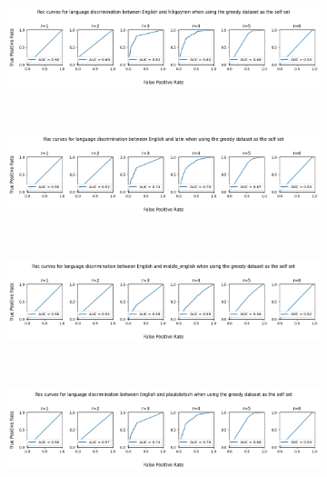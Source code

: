 \documentclass{article}
\begin{document}
\begin{figure}[ht]
    \begin{subfigure}[t]{\linewidth}
        \centering
        \includegraphics[width=\linewidth]{images/english_hiligayon_greedy.png}
        \label{fig:eng_hil_grd}
    \end{subfigure}
    \\
    \begin{subfigure}[t]{\linewidth}
        \centering
        \includegraphics[width=\linewidth]{images/english_latin_greedy.png}
        \label{fig:eng_lat_grd}
    \end{subfigure}
    \\
    \begin{subfigure}[t]{\linewidth}
        \centering
        \includegraphics[width=\linewidth]{images/english_middle_neglish_greedy.png}
        \label{fig:eng_mid_eng_grd}
    \end{subfigure}
    \\
    \begin{subfigure}[t]{\linewidth}
        \centering
        \includegraphics[width=\linewidth]{images/english_platudietsch_greedy.png}

\end{subfigure}
\end{figure}
\end{document}
